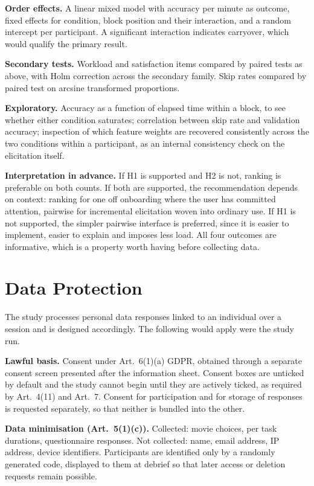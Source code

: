 \documentclass[11pt]{article}
\begin{document}
\textbf{Order effects.} A linear mixed model with accuracy per minute as outcome, fixed effects for condition, block position and their interaction, and a random intercept per participant. A significant interaction indicates carryover, which would qualify the primary result.

\textbf{Secondary tests.} Workload and satisfaction items compared by paired tests as above, with Holm correction across the secondary family. Skip rates compared by paired test on arcsine transformed proportions.

\textbf{Exploratory.} Accuracy as a function of elapsed time within a block, to see whether either condition saturates; correlation between skip rate and validation accuracy; inspection of which feature weights are recovered consistently across the two conditions within a participant, as an internal consistency check on the elicitation itself.

\textbf{Interpretation in advance.} If H1 is supported and H2 is not, ranking is preferable on both counts. If both are supported, the recommendation depends on context: ranking for one off onboarding where the user has committed attention, pairwise for incremental elicitation woven into ordinary use. If H1 is not supported, the simpler pairwise interface is preferred, since it is easier to implement, easier to explain and imposes less load. All four outcomes are informative, which is a property worth having before collecting data.

\section{Data Protection}
\label{sec:gdpr}
The study processes personal data responses linked to an individual over a session and is designed accordingly. The following would apply were the study run.

\textbf{Lawful basis.} Consent under Art.~6(1)(a) GDPR, obtained through a separate consent screen presented after the information sheet. Consent boxes are unticked by default and the study cannot begin until they are actively ticked, as required by Art.~4(11) and Art.~7. Consent for participation and for storage of responses is requested separately, so that neither is bundled into the other.

\textbf{Data minimisation (Art.~5(1)(c)).} Collected: movie choices, per task durations, questionnaire responses. Not collected: name, email address, IP address, device identifiers. Participants are identified only by a randomly generated code, displayed to them at debrief so that later access or deletion requests remain possible.
\end{document}

